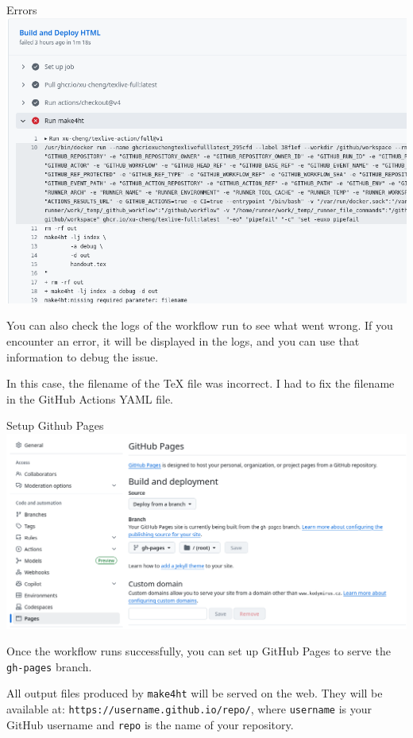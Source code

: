 \begin{frame}[fragile]{Errors}
  \includegraphics[width=\textwidth]{img/github-error.png}
\end{frame}


You can also check the logs of the workflow run to see what went wrong.
If you encounter an error, it will be displayed in the logs, and you can use that
information to debug the issue.

In this case, the filename of the TeX file was incorrect. I had to fix the filename in the GitHub Actions YAML file.


\begin{frame}[fragile]{Setup Github Pages}
  \includegraphics[width=\textwidth]{img/github-pages.png}
\end{frame}

Once the workflow runs successfully, you can set up GitHub Pages to serve the \texttt{gh-pages} branch.

All output files produced by \texttt{make4ht} will be served on the web.
They will be available at:
\verb|https://username.github.io/repo/|,
where \texttt{username} is your GitHub username and \texttt{repo} is the name of your repository.

